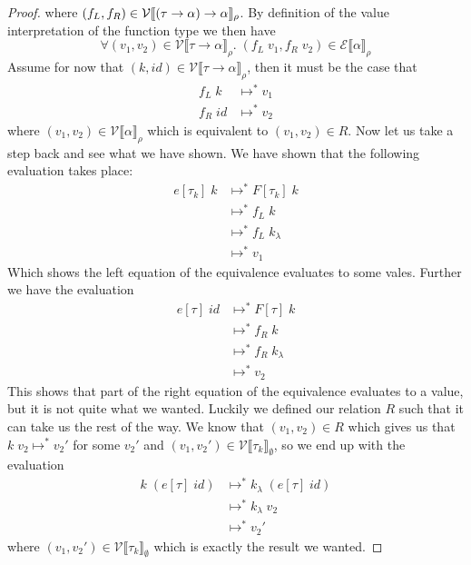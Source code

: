 \documentclass[a4paper,10pt,fleqn]{article}
\newcommand{\sem}[1]{\ensuremath{\llbracket #1 \rrbracket}}
\newcommand{\curly}[1]{\ensuremath{\mathcal{#1}}}
\newcommand{\evalto}{\ensuremath{\mapsto}}
\newcommand{\evaltos}[1][*]{\ensuremath{\evalto^{#1}}}
\newcommand{\tarrow}[2]{\ensuremath{ #1 \rightarrow #2}}
\newcommand{\prep}[3]{\ensuremath{\curly{#1}\sem{#3}_{#2}}}
\newcommand{\eprep}[2][\rho]{\prep{E}{#1}{#2}}
\newcommand{\vprep}[2][\rho]{\prep{V}{#1}{#2}}
\begin{document}
\begin{proof}
where $(f_L,f_R) \in \vprep[\rho]{\taa}$. By definition of the value interpretation of the function type we then have
\[
  \forall (v_1,v_2) \in \vprep[\rho]{\tarrow{\tau}{\alpha}}. \; (f_L \; v_1, f_R \; v_2) \in \eprep[\rho]{\alpha}
\]
Assume for now that $(k,id) \in \vprep[\rho]{\tarrow{\tau}{\alpha}}$, then it must be the case that 
\begin{align*}
  f_L \; k & \evaltos v_1 \\
  f_R \; id & \evaltos v_2
\end{align*}
where $(v_1,v_2) \in \vprep[\rho]{\alpha}$ which is equivalent to $(v_1,v_2) \in R$. Now let us take a step back and see what we have shown. We have shown that the following evaluation takes place:
\begin{align*}
  e[\tau_k]\; k & \evaltos F[\tau_k]\; k \\
                & \evaltos f_L \; k \\
                & \evaltos f_L \; k_\lambda \\
                & \evaltos v_1
\end{align*}
Which shows the left equation of the equivalence evaluates to some vales. Further we have the evaluation
\begin{align*}
  e[\tau]\; id & \evaltos F[\tau] \; k \\
               & \evaltos f_R \; k \\
               & \evaltos f_R \; k_\lambda \\
               & \evaltos v_2
\end{align*}
This shows that part of the right equation of the equivalence evaluates to a value, but it is not quite what we wanted. Luckily we defined our relation $R$ such that it can take us the rest of the way. We know that $(v_1,v_2) \in R$ which gives us that $k \; v_2 \evaltos v_2'$ for some $v_2'$ and $(v_1,v_2') \in \vprep[\emptyset]{\tau_k}$, so we end up with the evaluation
\begin{align*}
  k \; (e[\tau]\; id) & \evaltos k_\lambda \; (e[\tau]\; id) \\
                      & \evaltos k_\lambda \; v_2 \\
                      & \evaltos v_2'
\end{align*}
where $(v_1,v_2') \in \vprep[\emptyset]{\tau_k}$ which is exactly the result we wanted.


\end{proof}
\end{document}
